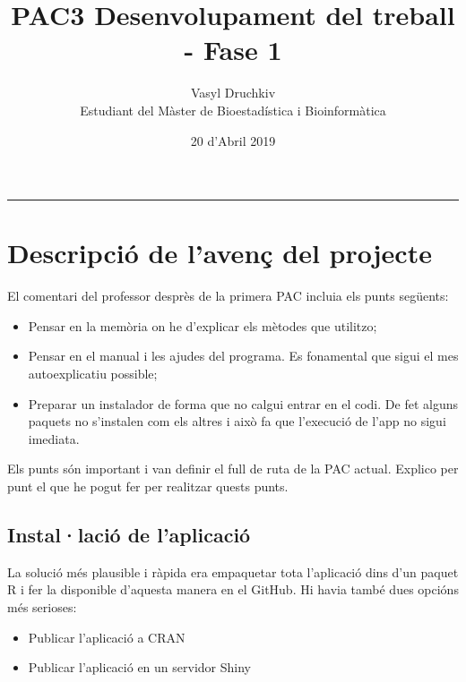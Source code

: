 \documentclass[]{article}
\title{PAC3 Desenvolupament del treball - Fase 1}
\date{20 d'Abril 2019}
\author{Vasyl Druchkiv \\ Estudiant del Màster de Bioestadística i Bioinformàtica}
\begin{document}
\maketitle
\makeatletter

\makeatother
\begin{spacing}{0.1}
\tableofcontents
\end{spacing}

\begin{center}
\noindent\rule{8cm}{0.4pt}
\end{center}

\section{Descripció de l'avenç del projecte} 
El comentari del professor desprès de la primera PAC incluia els punts següents:

\begin{itemize}
\item Pensar en la memòria on he d'explicar els mètodes que utilitzo;

\item Pensar en el manual i les ajudes del programa. Es fonamental que sigui el mes autoexplicatiu possible;

\item Preparar un instalador de forma que no calgui entrar en el codi. De fet alguns paquets no s'instalen com els altres i això fa que l'execució de l'app no sigui imediata.

\end{itemize}

Els punts són important i van definir el full de ruta de la PAC actual. Explico per punt el que he pogut fer  per realitzar quests punts.

 \subsection{Instal·lació de l'aplicació}

La solució més plausible i ràpida era empaquetar tota l'aplicació dins d'un paquet R i fer la disponible d'aquesta manera en el GitHub. Hi havia també dues opcións més serioses: 

\begin{itemize}
\item Publicar l'aplicació a CRAN
\item Publicar l'aplicació en un servidor Shiny
\end{itemize}
 
\end{document}
